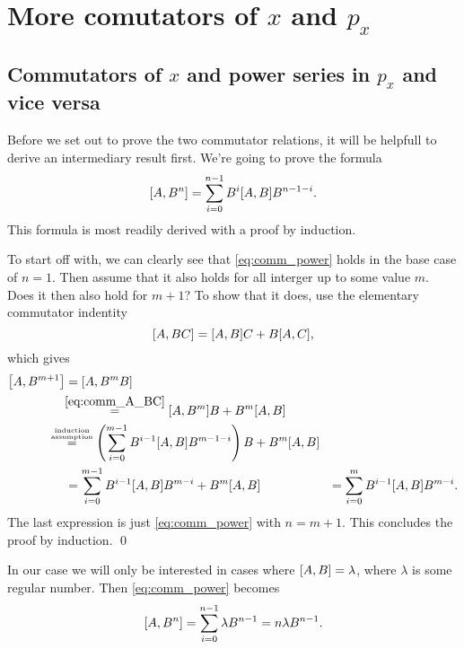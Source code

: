 \documentclass[11pt,letter, swedish, english
]{article}
\begin{document}
\section{More comutators of $x$ and $p_x$}

\subsection{Commutators of $x$ and power series in $p_x$ and vice versa}
Before we set out to prove the two commutator relations, it will be
helpfull to derive an intermediary result first. We're going to prove
the formula
\begin{equation} \label{eq:comm_power}
\comm{A}{B^n} = \sum_{i=0}^{n-1} B^{i}\comm{A}{B}B^{n-1-i}.
\end{equation}
This formula is most readily derived with a proof by induction. 

To start off with, we can clearly see that \eqref{eq:comm_power} holds
in the base case of $n=1$. Then assume that it also holds for all
interger up to some value $m$. Does it then also hold for $m+1$?
To show that it does, use the elementary commutator
indentity
\begin{equation} \label{eq:comm_A_BC}
\comm{A}{BC} = \comm{A}{B}C+B\comm{A}{C},
\end{equation}
which gives
\begin{equation}
\begin{aligned}
\comm{A}{B^{m+1}} &= \comm{A}{B^{m}B} \\
&\hspace{-3pt}\stackrel{\eqref{eq:comm_A_BC}}{=} \comm{A}{B^{m}}B + B^m\comm{A}{B}\\
&\hspace{-14pt}\stackrel{\stackrel{\text{\tiny induction}}{\text{\tiny assumption}}}{=}
\left(\sum_{i=0}^{m-1} B^{i-1}\comm{A}{B}B^{m-1-i}\right) B + B^m\comm{A}{B}\\
&=\sum_{i=0}^{m-1} B^{i-1}\comm{A}{B}B^{m-i} + B^m\comm{A}{B}&=\sum_{i=0}^{m} B^{i-1}\comm{A}{B}B^{m-i}.
\end{aligned}
\end{equation}
The last expression is just \eqref{eq:comm_power} with $n=m+1$. This
concludes the proof by induction. \qed

In our case we will only be interested in cases where $\comm{A}{B}=\lambda$,
where $\lambda$ is some regular number. Then \eqref{eq:comm_power} becomes
\begin{equation} \label{eq:comm_power_c}
\comm{A}{B^n} = \sum_{i=0}^{n-1} \lambda B^{n-1} = n\lambda B^{n-1}.
\end{equation}
\end{document}
